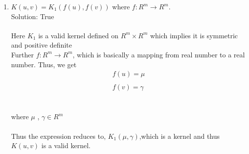 \documentclass[twoside,11pt]{article}\usepackage{amsmath,amsfonts,amsthm,fullpage}
\begin{document}
\begin{enumerate}
\item $K(u,v) = K_1(f(u), f(v))$ where $f:R^m \rightarrow R^m$.
\\ Solution: True
\\\\ Here $K_1$ is a valid kernel defined on $R^m\times R^m$ which implies it is symmetric and positive definite
\\ Further $f:R^m \rightarrow R^m$, which is basically a mapping from real number to a real number.
Thus, we get \\
\begin{equation} \nonumber
\begin{split}
f(u) = \mu \\\\ f(v) = \gamma 
\end{split}
\end{equation}
\\\\ where $\mu$ , $\gamma \in R^m$
\\\\ Thus the expression reduces to,  $ K_1 ( \mu , \gamma ) $,which is a kernel  and thus $K(u,v) $ is a valid kernel.
\\\\


\end{enumerate}
\end{document}

